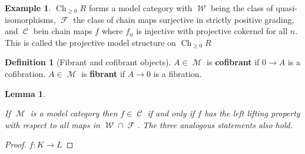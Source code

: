 \documentclass[10pt,]{book}
\newcommand{\terminology}[1]{\textbf{#1}}
\theoremstyle{plain}
\newtheorem{lemma}[theorem]{Lemma}
\theoremstyle{definition}
\newtheorem{definition}[theorem]{Definition}
\newtheorem{example}[theorem]{Example}
\numberwithin{equation}{section}
\DeclareMathOperator{\Ch}{Ch}
\DeclareMathOperator{\cM}{\mathcal{M}}
\DeclareMathOperator{\sC}{\mathscr{C}}
\DeclareMathOperator{\sF}{\mathscr{F}}
\DeclareMathOperator{\sW}{\mathscr{W}}
\begin{document}
\begin{example}\label{example-23}
\(\Ch_{\ge 0} R\) forms a model category with \(\sW\) being the class of quasi-isomorphisms, \(\sF\) the class of chain maps surjective in strictly positive grading, and \(\sC\) bein chain maps \(f\) where \(f_n\) is injective with projective cokernel for all \(n\).
            This is called the projective model structure on \(\Ch_{\ge 0} R\)\end{example}
\begin{definition}[Fibrant and cofibrant objects]\label{definition-32}
\(A\in \cM\) is \terminology{cofibrant} if \(0 \to A\) is a cofibration.
            \(A\in \cM\) is \terminology{fibrant} if \(A\to 0\) is a fibration.
          \end{definition}
\begin{lemma}\label{lemma-7}

            If \(\cM\) is a model category then \(f \in \sC\) if and only if \(f\) has the left lifting property with respect to all maps in \(\sW \cap \sF\).
            The three analogous statements also hold.
          \end{lemma}
\begin{proof}
\(f\colon K \to L\)\end{proof}
%
\backmatter
%
\end{document}
